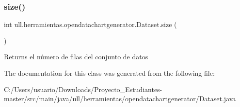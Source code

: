 \subsubsection{\texorpdfstring{size()}{size()}}
{\footnotesize\ttfamily int ull.\+herramientas.\+opendatachartgenerator.\+Dataset.\+size (\begin{DoxyParamCaption}{ }\end{DoxyParamCaption})}

\begin{DoxyReturn}{Returns}
el número de filas del conjunto de datos 
\end{DoxyReturn}


The documentation for this class was generated from the following file\+:\begin{DoxyCompactItemize}
\item 
C\+:/\+Users/usuario/\+Downloads/\+Proyecto\+\_\+\+Estudiantes-\/master/src/main/java/ull/herramientas/opendatachartgenerator/Dataset.\+java\end{DoxyCompactItemize}
